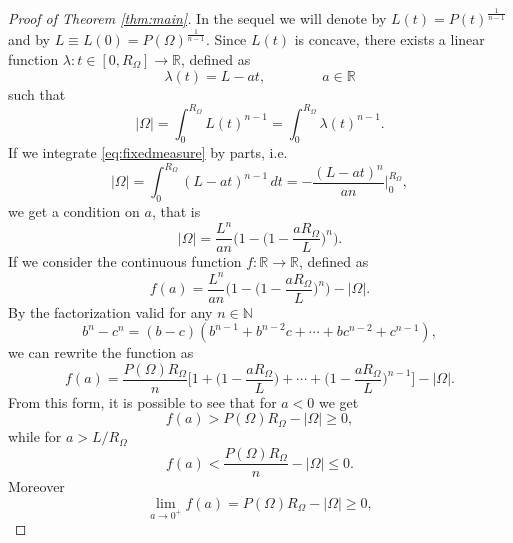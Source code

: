 \documentclass[oneside,a4paper,11pt,notitlepage]{article}
\newcommand{\abs}[1]{{\left|#1\right|}}
\theoremstyle{definition}
\theoremstyle{plain}
\theoremstyle{definition}
\begin{document}
\begin{proof}[Proof of Theorem \ref{thm:main}]
    In the sequel we will denote by $L(t)=P(t)^{\frac{1}{n-1}}$ and by $L\equiv L(0)=P(\Omega)^{\frac{1}{n-1}}$. Since $L(t)$ is concave, there exists a linear function $\lambda : t\in [0,R_\Omega]\to \mathbb R$, defined as
    \begin{equation*}
        \lambda(t) = L-at,\qquad \qquad a \in\mathbb R
    \end{equation*}
    such that
    \begin{equation}\label{eq:fixedmeasure}
        \abs{\Omega}= \int_0^{R_\Omega}L(t)^{n-1}=\int_0^{R_\Omega}\lambda(t)^{n-1}. 
    \end{equation}
    If we integrate \eqref{eq:fixedmeasure} by parts, i.e.
    \begin{equation*}
        \abs{\Omega}= \int_0^{R_\Omega}(L-at)^{n-1}\,dt = -\frac{(L-at)^n}{an}\bigg|_0^{R_\Omega},
    \end{equation*}
    we get a condition on $a$, that is
    \begin{equation}\label{eq:measureomegaa}
        \abs{\Omega}= \frac{L^n}{an}\bigg(1-\bigg(1-\frac{aR_\Omega}{L}\bigg)^n\bigg).
    \end{equation}
    If we consider the continuous function $f:\mathbb R \to \mathbb R$, defined as
\begin{equation*}
    f(a) = \frac{L^n}{an}\bigg(1-\bigg(1-\frac{aR_\Omega}{L}\bigg)^n\bigg)-\abs{\Omega}.
\end{equation*}
By the factorization valid for any $n\in\mathbb N$
\begin{equation*}
    b^n-c^n= (b-c)(b^{n-1}+b^{n-2}c+\cdots +bc^{n-2}+c^{n-1}),
\end{equation*}
we can rewrite the function as
\begin{equation*}
    f(a) = \frac{P(\Omega)R_\Omega}{n}\bigg[1+\bigg(1-\frac{aR_\Omega}{L}\bigg)+\cdots +\bigg(1-\frac{aR_\Omega}{L}\bigg)^{n-1}\bigg]-\abs{\Omega}.
\end{equation*}
From this form, it is possible to see that for $a<0$ we get
\begin{equation*}
    f(a) > P(\Omega)R_\Omega-\abs{\Omega} \ge 0,
\end{equation*}
while for $a> L/R_\Omega$
\begin{equation*}
    f(a) <\frac{P(\Omega)R_\Omega}{n}-\abs{\Omega}\le 0.
\end{equation*}
Moreover
\begin{equation*}
    \lim_{a\to 0^+}f(a)= P(\Omega)R_\Omega-\abs{\Omega}\ge 0,

\end{equation*}
\end{proof}
\end{document}
